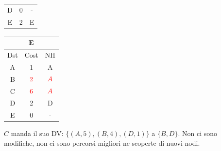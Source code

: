 \documentclass[10pt]{article}
\begin{document}
\begin{table}[h!]
\begin{tabular}{|c||c||c|}
					D & 0 & - \\
					E & 2 & E \\
					\hline
				\end{tabular}
				\begin{tabular}{|c||c||c|}
					\hline
					\multicolumn{3}{|c|}{E} \\
					\hline
					Dst & Cost & NH \\
					\hline
					A & 1 & A \\
					B & $\color{red} 2$ & $\color{red} A$ \\
					C & $\color{red} 6$ & $\color{red} A$ \\
					D & 2 & D \\
					E & 0 & - \\
					\hline
				\end{tabular}
			\end{table}
			\newline \newline
			$C$ manda il suo DV: $\{(A,5),(B,4),(D,1)\}$ a $\{B,D\}$.
			\newline
			Non ci sono modifiche, non ci sono percorsi migliori ne scoperte di nuovi nodi.
\end{document}
